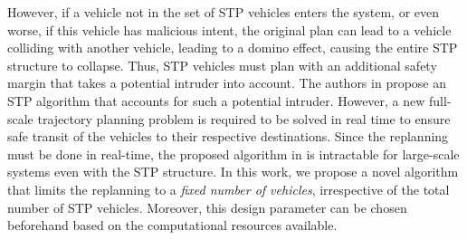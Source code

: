 However, if a vehicle not in the set of STP vehicles enters the system, or even worse, if this vehicle has malicious intent, the original plan can lead to a vehicle colliding with another vehicle, leading to a domino effect, causing the entire STP structure to collapse. Thus, STP vehicles must plan with an additional safety margin that takes a potential intruder into account. The authors in \cite{chen2016robust} propose an STP algorithm that accounts for such a potential intruder. However, a new full-scale trajectory planning problem is required to be solved in real time to ensure safe transit of the vehicles to their respective destinations. Since the replanning must be done in real-time, the proposed algorithm in \cite{chen2016robust} is intractable for large-scale systems even with the STP structure. In this work, we propose a novel algorithm that limits the replanning to a \textit{fixed number of vehicles}, irrespective of the total number of STP vehicles. Moreover, this design parameter can be chosen beforehand based on the computational resources available. 

